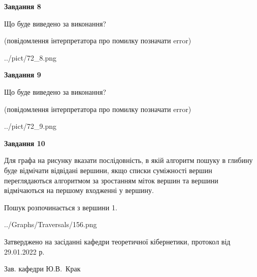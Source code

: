 \documentclass[12pt, ukrainian]{article}
\begin{document}
{\begin {large}
{\begin {center}\textbf{Завдання 8}\end {center}}\par
Що буде виведено за виконання?\par
 (повідомлення інтерпретатора про помилку позначати error)
\begin{center}
	{../pict/72_8.png}
\end{center}
\newpage

{\begin {center}\textbf{Завдання 9}\end {center}}\par
Що буде виведено за виконання?\par
 (повідомлення інтерпретатора про помилку позначати error)\par
\begin{center}
	{../pict/72_9.png}
\end{center}
\newpage

{\begin {center}\textbf{Завдання 10}\end {center}}\par
Для графа на рисунку вказати послідовність, в якій алгоритм пошуку в глибину буде відмічати відвідані вершини, якщо списки суміжності вершин переглядаються алгоритмом за зростанням міток вершин та вершини відмічаються на першому вход\-женні у вершину.\par
Пошук розпочинається з вершини 1.\par

\begin{center}
	{../Graphs/Traversals/156.png}
\end{center}\par
\newpage


\end {large}
}
{\smallskip \begin {small} Затверджено на засіданні кафедри теоретичної кібернетики, протокол  від   29.01.2022 р.\par\smallskip\smallskip
{\parbox {6.5 cm}{Зав. кафедри \dotfill Ю.В.~Крак}} \end{small}}
\end{document}
